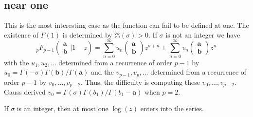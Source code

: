 \documentclass[12pt]{article}
\numberwithin{equation}{section}
\newcommand{\Head}[3] {{}_{#1}{#2}_{#3}}
\newcommand{\ArgS}[3] {( \begin{smallmatrix} #1 \\ #2 \end{smallmatrix} | {#3})}
\newcommand{\ParamS}[2] {( \begin{smallmatrix} #1 \\ #2 \end{smallmatrix})}
\newcommand{\bfa}[0] {\mathbf{a}}
\begin{document}
\subsection{near one}
This is the most interesting case as the function can fail to be defined at one. The existence of $F(1)$ is determined by $\Re(\sigma)> 0$. If $\sigma$ is not an integer we have
\begin{equation}
\label{nearone}
\Head{p}{F}{p-1} \ArgS{\mathbf{a}}{\mathbf{b}}{1-z} = \sum_{n=0}^{\infty} u_n \ParamS{\mathbf{a}}{\mathbf{b}} z^{\sigma+n} + \sum_{n=0}^{\infty} v_n \ParamS{\mathbf{a}}{\mathbf{b}} z^n
\end{equation}
with the $u_1,u_2,\dots$ determined from a recurrence of order $p-1$ by $u_0 = \Gamma(-\sigma)\Gamma(\mathbf{b})/\Gamma(\mathbf{a})$ and the $v_{p-1}, v_p, \dots$ determined from a recurrence of order $p-1$ by $v_0, \dots, v_{p-2}$. Thus, the difficulty is computing these $v_0, \dots, v_{p-2}$. Gauss derived $v_0 = \Gamma(\sigma)\Gamma(b_1)/\Gamma(b_1-\bfa)$ when $p=2$.

If $\sigma$ is an integer, then at most one $\log(z)$ enters into the series.
\end{document}
